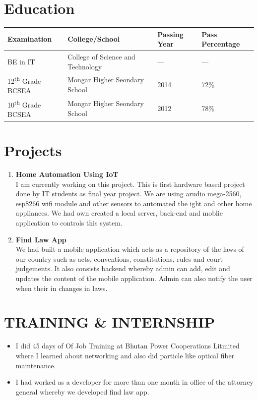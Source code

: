 \documentclass[10pt]{article}
\begin{document}
	\section{Education}
	\begin{center}  
		\begin{tabular}{ | l | l | l | l |}
			\hline
			\textbf{Examination} & \textbf{College/School}  & \textbf{Passing Year} & \textbf{Pass Percentage}\\ \hline
			BE in IT &College of Science and Technology &---\- & ---\-\\ \hline
			12\textsuperscript{th} Grade BCSEA & Mongar Higher Seondary School & 2014 & 72\% \\ \hline
			10\textsuperscript{th} Grade BCSEA & Mongar Higher Seondary School & 2012 & 78\% \\ \hline
		\end{tabular}
	\end{center}

	\section{Projects}
	\begin{enumerate}
		\item {\bf Home Automation Using IoT}\\
		I am currently working on this project. This is first hardware based project done by IT students as final year project. We are using arudio mega-2560, esp8266 wifi module and other sensors to automated the ight and other home appliances. We had own created a local server, back-end and moblie application to controls this system.
		\item {\bf Find Law App}\\
		We had built a mobile application which acts as a repository of the laws of our country such as acts, conventions, constitutions, rules and court judgements. It also consists backend whereby admin can add, edit and updates the content of the mobile application. Admin can also notify the user when their in changes in laws.
	
	\end{enumerate}
 
	\section{TRAINING \& INTERNSHIP}
	\begin{itemize}
		\item  I did 45 days of Of Job Training at Bhutan Power Cooperations Litmited where I learned about networking and also did particle like optical fiber maintenance.
		\item I had worked as a developer for more than one month in office of the attorney general whereby we developed find law app.
	\end{itemize}
\end{document}
